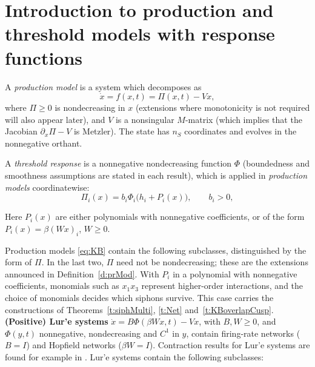 \section{Introduction to production and threshold models with response functions}
\label{sec:intro}

\label{d:KB}
A \emph{production model}  is a system which decomposes as
\begin{equation}\label{eq:KB}
 \dot x=f(x,t)=\Pi(x,t)-Vx,
\end{equation}
where $\Pi\ge0$ is nondecreasing in $x$  (extensions where monotonicity is not required will  also
appear  later), and $V$ is a nonsingular
$M$-matrix (which implies that the Jacobian $\partial_x\Pi -V$ is Metzler). The state has $n_S$ coordinates and
evolves in the nonnegative orthant.

A \emph{threshold response} is a nonnegative nondecreasing function $\Phi$
(boundedness and smoothness assumptions are stated in each result),
which is applied in
\emph{production  models} coordinatewise:
\begin{equation}\label{polR}
 \Pi_i(x)=b_i\Phi_i\bigl(h_i+P_i(x)\bigr),\qquad b_i>0,
\end{equation}



Here $P_i(x)$ are either polynomials with nonnegative coefficients, or of the form
$P_i(x)=\beta(Wx)_i$, $W\ge0$.

\eeD

Production models \eqref{eq:KB} contain the following subclasses, distinguished by the form of $\Pi$. In the last two, $\Pi$ need
not be nondecreasing; these are the extensions announced in Definition~\ref{d:prMod}.
\BEN
{}
With $P_i$ in  a polynomial with nonnegative coefficients, monomials such as $x_1x_3$ represent higher-order interactions, and the
choice of monomials decides which siphons survive. This case carries the constructions of Theorems~\ref{t:siphMulti},
\ref{t:Net} and~\ref{t:KBoverlapCusp}.
\im
{\bf (Positive) Lur'e systems} $\dot x=B\Phi(\beta Wx,t)-Vx$, with $B,W\ge0$, and $\Phi(y,t)$ nonnegative, nondecreasing and $C^1$ in $y$, contain firing-rate networks ($B=I$) and Hopfield networks ($\beta W=I$). Contraction results for Lur'e systems are found for example in \cite{Davydov,davydov2024exponential,OfirOvseevichMargaliot2024,OfirSlotineMargaliot2025}.
Lur'e systems contain the following subclasses:
\BEN


